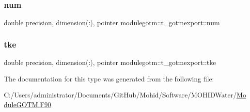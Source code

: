 \subsubsection{\texorpdfstring{num}{num}}
{\footnotesize\ttfamily double precision, dimension(\+:), pointer modulegotm\+::t\+\_\+gotmexport\+::num\hspace{0.3cm}{\ttfamily [private]}}

\mbox{\label{structmodulegotm_1_1t__gotmexport_ad511cb091890fff2ad674cf09fee3642}} 
\subsubsection{\texorpdfstring{tke}{tke}}
{\footnotesize\ttfamily double precision, dimension(\+:), pointer modulegotm\+::t\+\_\+gotmexport\+::tke\hspace{0.3cm}{\ttfamily [private]}}



The documentation for this type was generated from the following file\+:\begin{DoxyCompactItemize}
\item 
C\+:/\+Users/administrator/\+Documents/\+Git\+Hub/\+Mohid/\+Software/\+M\+O\+H\+I\+D\+Water/\mbox{\hyperlink{_module_g_o_t_m_8_f90}{Module\+G\+O\+T\+M.\+F90}}\end{DoxyCompactItemize}
